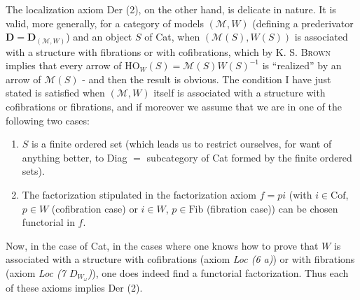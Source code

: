 The localization axiom Der (2), on the other hand, is delicate in nature. It is valid, more generally, for a category of models $(\mathcal{M},W)$ (defining a prederivator $\mathbf{D} = \mathbf{D}_{(\mathcal{M},W)}$) and an object $S$ of Cat, when $(\mathcal{M}(S),W(S))$ is associated with a structure with fibrations or with cofibrations, which by K. S. \textsc{Brown} implies that every arrow of $\mathrm{HO}_W(S) = \mathcal{M}(S)W(S)^{-1}$ is ``realized'' by an arrow of $\mathcal{M}(S)$ - and then the result is obvious. The condition I have just stated is satisfied when $(\mathcal{M},W)$ itself is associated with a structure with cofibrations or fibrations,
and if moreover we assume that we are in one of the following two cases: %
\begin{enumerate}[label=\alph*)]
\item $S$ is a finite ordered set (which leads us to restrict ourselves, for want of anything better, to Diag $=$ subcategory of Cat formed by the finite ordered sets).
\item The factorization stipulated in the factorization axiom $f = pi$ (with $i \in \mathrm{Cof}$, $p \in W$ (cofibration case) or $i \in W$, $p \in \mathrm{Fib}$ (fibration case)) can be chosen functorial in $f$.
\end{enumerate}
Now, in the case of Cat, in the cases where one knows how to prove that $W$ is associated with a structure with cofibrations (axiom \textit{Loc (6 a)}) or with fibrations (axiom \textit{Loc (7 $D_{W_\omega}$)}), one does indeed find a functorial factorization. Thus each of these axioms implies Der (2). %

